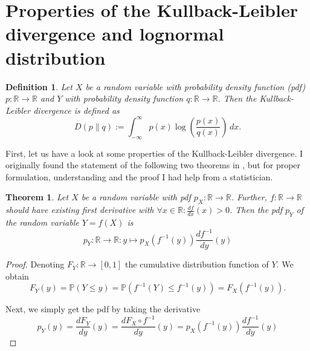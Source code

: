 \documentclass{article}
\newtheorem{definition}{Definition}[section]
\newtheorem{theorem}{Theorem}[section]
\begin{document}
\section{Properties of the Kullback-Leibler divergence and lognormal distribution}
\begin{definition}
Let $X$ be a random variable with probability density function (pdf) $p:\mathbb{R}\rightarrow\mathbb{R}$ and $Y$ with probability density function $q:\mathbb{R}\rightarrow\mathbb{R}$. Then the Kullback-Leibler divergence is defined as
\begin{equation}
    D(p\parallel q):=\int _{-\infty }^{\infty }p(x)\log \left({\frac {p(x)}{q(x)}}\right)\,dx \text{.}
\end{equation}
\end{definition}

First, let us have a look at some properties of the Kullback-Leibler divergence. I originally found the statement of the following two theorems in \cite{kullback_leibler_divergence}, but for proper formulation, understanding and the proof I had help from a statistician. 

\begin{theorem}
\label{pdf_under_transformation}
Let $X$ be a random variable with pdf $p_{X}:\mathbb{R} \rightarrow \mathbb{R}$. Further, $f:\mathbb{R} \rightarrow \mathbb{R}$ should have existing first derivative with $\forall x \in \mathbb{R}: \frac{df}{dx}(x) > 0$. Then the pdf $p_{Y}$ of the random variable $Y = f(X)$ is 
\begin{equation}
    p_{Y}:\mathbb{R} \rightarrow \mathbb{R}: y \mapsto p_{X}(f^{-1}(y))\frac{df^{-1}}{dy}(y)
\end{equation}
\end{theorem}

\begin{proof}
Denoting $F_{Y}:\mathbb{R} \rightarrow [0,1]$ the cumulative distribution function of $Y$. We obtain 
\begin{equation}
    F_{Y}(y)=\mathbb{P}(Y \leq y) = \mathbb{P}\left(f^{-1}(Y) \leq f^{-1}(y)\right) = F_{X}\left(f^{-1}(y)\right) \text{.}
\end{equation}

Next, we simply get the pdf by taking the derivative
\begin{equation}
    p_{Y}(y) = \frac{dF_{Y}}{dy}(y) = \frac{dF_{X} \circ f^{-1}}{dy}(y) = p_{X}\left(f^{-1}(y)\right)\frac{df^{-1}}{dy}(y)
\end{equation}
\end{proof}
\end{document}

